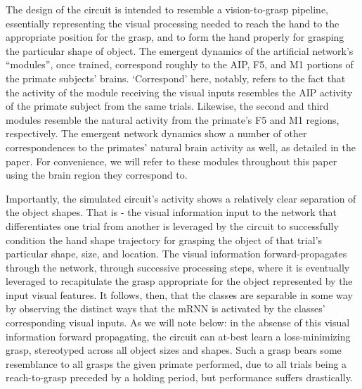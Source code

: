 \documentclass[12pt]{iopart}
\begin{document}
The design of the circuit is intended to resemble a vision-to-grasp pipeline, essentially
representing the visual processing needed to reach the hand to the appropriate position for
the grasp, and to form the hand properly for grasping the particular shape of object. The
emergent dynamics of the artificial network's ``modules'', once trained, correspond roughly
to the AIP, F5, and M1 portions of the primate subjects' brains. `Correspond' here, notably,
refers to the fact that the activity of the module receiving the visual inputs resembles
the AIP activity of the primate subject from the same trials. Likewise, the second and
third modules resemble the natural activity from the primate's F5 and M1 regions, respectively.
The emergent network dynamics show a number of other correspondences to the primates' natural
brain activity as well, as detailed in the paper. For convenience, we will refer to these
modules throughout this paper using the brain region they correspond to.

Importantly, the simulated circuit's activity shows a relatively clear separation of the
object shapes. That is - the visual information input to the network that differentiates
one trial from another is leveraged by the circuit to successfully condition
the hand shape trajectory for grasping the object of that trial's particular shape, size, and
location. The visual information forward-propagates through the network, through successive
processing steps, where it is eventually leveraged to recapitulate the grasp appropriate
for the object represented by the input visual features. It follows, then, that the classes
are separable in some way by observing the distinct ways that the mRNN is activated by the
classes' corresponding visual inputs. As we will note below: in the absense of this
visual information forward propagating, the circuit can at-best learn a loss-minimizing grasp,
stereotyped across all object sizes and shapes. Such a grasp bears some resemblance to all
grasps the given primate performed, due to all trials being a reach-to-grasp preceded by a
holding period, but performance suffers drastically.
\end{document}

